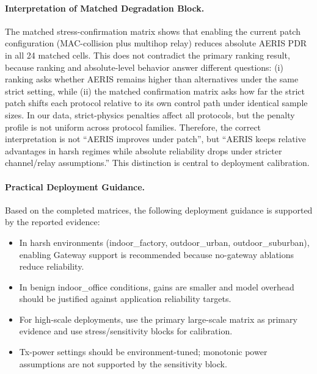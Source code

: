 ﻿\documentclass[sensors,article,submit,moreauthors,pdftex]{Definitions/mdpi}
\begin{document}
\paragraph{Interpretation of Matched Degradation Block.}
The matched stress-confirmation matrix shows that enabling the current patch configuration (MAC-collision plus multihop relay) reduces absolute AERIS PDR in all 24 matched cells. This does not contradict the primary ranking result, because ranking and absolute-level behavior answer different questions: (i) ranking asks whether AERIS remains higher than alternatives under the same strict setting, while (ii) the matched confirmation matrix asks how far the strict patch shifts each protocol relative to its own control path under identical sample sizes. In our data, strict-physics penalties affect all protocols, but the penalty profile is not uniform across protocol families. Therefore, the correct interpretation is not ``AERIS improves under patch'', but ``AERIS keeps relative advantages in harsh regimes while absolute reliability drops under stricter channel/relay assumptions.'' This distinction is central to deployment calibration.

\paragraph{Practical Deployment Guidance.}
Based on the completed matrices, the following deployment guidance is supported by the reported evidence:
\begin{itemize}
\item In harsh environments (indoor\_factory, outdoor\_urban, outdoor\_suburban), enabling Gateway support is recommended because no-gateway ablations reduce reliability.
\item In benign indoor\_office conditions, gains are smaller and model overhead should be justified against application reliability targets.
\item For high-scale deployments, use the primary large-scale matrix as primary evidence and use stress/sensitivity blocks for calibration.
\item Tx-power settings should be environment-tuned; monotonic power assumptions are not supported by the sensitivity block.
\end{itemize}
\end{document}
